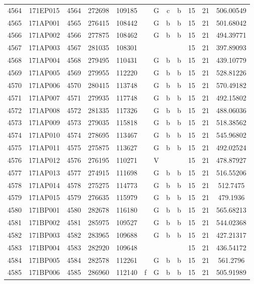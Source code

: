 \begin{tabular}{|*{12}{c|}}
4564 & 171EP015 & 4564 & 272698 & 109185 &  & G & c & b & 15 & 21 & 506.00549 \\ 
4565 & 171AP001 & 4565 & 276415 & 108442 &  & G & b & b & 15 & 21 & 501.68042 \\ 
4566 & 171AP002 & 4566 & 277875 & 108462 &  & G & b & b & 15 & 21 & 494.39771 \\ 
4567 & 171AP003 & 4567 & 281035 & 108301 &  &  &  &  & 15 & 21 & 397.89093 \\ 
4568 & 171AP004 & 4568 & 279495 & 110431 &  & G & b & b & 15 & 21 & 439.10779 \\ 
4569 & 171AP005 & 4569 & 279955 & 112220 &  & G & b & b & 15 & 21 & 528.81226 \\ 
4570 & 171AP006 & 4570 & 280415 & 113748 &  & G & b & b & 15 & 21 & 570.49182 \\ 
4571 & 171AP007 & 4571 & 279935 & 117748 &  & G & b & b & 15 & 21 & 492.15802 \\ 
4572 & 171AP008 & 4572 & 281335 & 117326 &  & G & b & b & 15 & 21 & 488.06036 \\ 
4573 & 171AP009 & 4573 & 279035 & 115818 &  & G & b & b & 15 & 21 & 518.38562 \\ 
4574 & 171AP010 & 4574 & 278695 & 113467 &  & G & b & b & 15 & 21 & 545.96802 \\ 
4575 & 171AP011 & 4575 & 275875 & 113627 &  & G & b & b & 15 & 21 & 492.02524 \\ 
4576 & 171AP012 & 4576 & 276195 & 110271 &  & V &  &  & 15 & 21 & 478.87927 \\ 
4577 & 171AP013 & 4577 & 274915 & 111698 &  & G & b & b & 15 & 21 & 516.55206 \\ 
4578 & 171AP014 & 4578 & 275275 & 114773 &  & G & b & b & 15 & 21 & 512.7475 \\ 
4579 & 171AP015 & 4579 & 276635 & 115979 &  & G & b & b & 15 & 21 & 479.1936 \\ 
4580 & 171BP001 & 4580 & 282678 & 116180 &  & G & b & b & 15 & 21 & 565.68213 \\ 
4581 & 171BP002 & 4581 & 285975 & 109527 &  & G & b & b & 15 & 21 & 544.02368 \\ 
4582 & 171BP003 & 4582 & 283965 & 109688 &  & G & b & b & 15 & 21 & 427.21317 \\ 
4583 & 171BP004 & 4583 & 282920 & 109648 &  &  &  &  & 15 & 21 & 436.54172 \\ 
4584 & 171BP005 & 4584 & 282578 & 112261 &  & G & b & b & 15 & 21 & 561.2796 \\ 
4585 & 171BP006 & 4585 & 286960 & 112140 & f & G & b & b & 15 & 21 & 505.91989 \\ 

\end{tabular}
